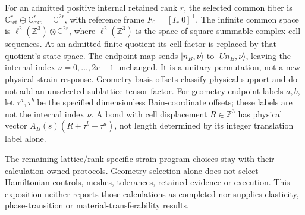 For an admitted positive internal retained rank $r$, the selected common fiber is
$\mathbb C^r_{\mathrm{ret}}\oplus\mathbb C^r_{\mathrm{ext}}=\mathbb C^{2r}$,
with reference frame $F_0=[I_r\;0]^{\mathsf T}$. The infinite common space
is $\ell^2(\mathbb Z^3)\otimes\mathbb C^{2r}$, where $\ell^2(\mathbb Z^3)$
is the space of square-summable complex cell sequences. At an admitted finite
quotient its cell factor is replaced by that quotient's state space. The
endpoint map sends $|n_B,\nu\rangle$ to $|Un_B,\nu\rangle$, leaving
the internal index $\nu=0,\ldots,2r-1$ unchanged. It is a unitary
permutation, not a new physical strain response. Geometry basis offsets
classify physical support and do not add an unselected sublattice tensor
factor. For geometry endpoint labels $a,b$, let $\tau^a,\tau^b$ be the
specified dimensionless Bain-coordinate offsets; these labels are not the
internal index $\nu$. A bond with cell displacement $R\in\mathbb Z^3$
has physical vector $A_B(s)(R+\tau^b-\tau^a)$, not length determined by
its integer translation label alone.

The remaining lattice/rank-specific strain program choices stay with their
calculation-owned protocols. Geometry selection alone does not select
Hamiltonian controls, meshes, tolerances, retained evidence or execution.
This exposition neither reports those calculations as completed nor supplies
elasticity, phase-transition or material-transferability results.
